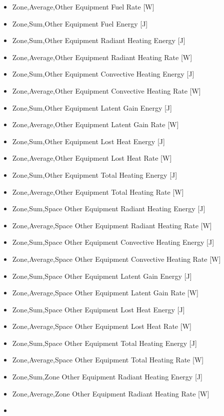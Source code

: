 \begin{itemize}
\item
  Zone,Average,Other Equipment Fuel Rate {[}W{]}
\item
  Zone,Sum,Other Equipment Fuel Energy {[}J{]}
\item
  Zone,Sum,Other Equipment Radiant Heating Energy {[}J{]}
\item
  Zone,Average,Other Equipment Radiant Heating Rate {[}W{]}
\item
  Zone,Sum,Other Equipment Convective Heating Energy {[}J{]}
\item
  Zone,Average,Other Equipment Convective Heating Rate {[}W{]}
\item
  Zone,Sum,Other Equipment Latent Gain Energy {[}J{]}
\item
  Zone,Average,Other Equipment Latent Gain Rate {[}W{]}
\item
  Zone,Sum,Other Equipment Lost Heat Energy {[}J{]}
\item
  Zone,Average,Other Equipment Lost Heat Rate {[}W{]}
\item
  Zone,Sum,Other Equipment Total Heating Energy {[}J{]}
\item
  Zone,Average,Other Equipment Total Heating Rate {[}W{]}
\item
  Zone,Sum,Space Other Equipment Radiant Heating Energy {[}J{]}
\item
  Zone,Average,Space Other Equipment Radiant Heating Rate {[}W{]}
\item
  Zone,Sum,Space Other Equipment Convective Heating Energy {[}J{]}
\item
  Zone,Average,Space Other Equipment Convective Heating Rate {[}W{]}
\item
  Zone,Sum,Space Other Equipment Latent Gain Energy {[}J{]}
\item
  Zone,Average,Space Other Equipment Latent Gain Rate {[}W{]}
\item
  Zone,Sum,Space Other Equipment Lost Heat Energy {[}J{]}
\item
  Zone,Average,Space Other Equipment Lost Heat Rate {[}W{]}
\item
  Zone,Sum,Space Other Equipment Total Heating Energy {[}J{]}
\item
  Zone,Average,Space Other Equipment Total Heating Rate {[}W{]}
\item
  Zone,Sum,Zone Other Equipment Radiant Heating Energy {[}J{]}
\item
  Zone,Average,Zone Other Equipment Radiant Heating Rate {[}W{]}
\item

\end{itemize}
